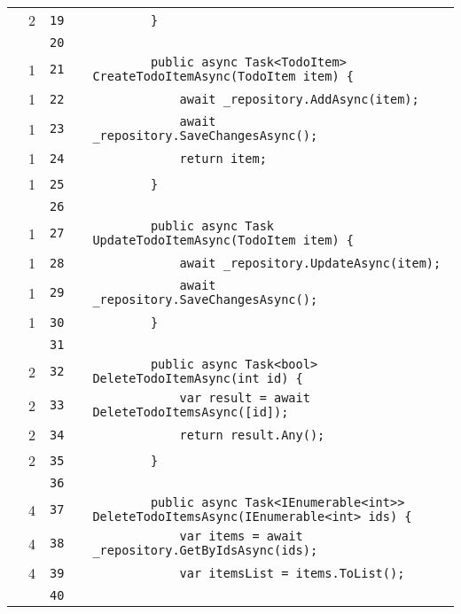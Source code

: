 \documentclass[a4paper,landscape,10pt]{article}
\begin{document}
\begin{longtable}[l]{lrrll}
\cellcolor{green} & 2 & \verb~19~ & & \verb~        }~\\
\cellcolor{gray} &  & \verb~20~ & & \verb~~\\
\cellcolor{green} & 1 & \verb~21~ & & \verb~        public async Task<TodoItem> CreateTodoItemAsync(TodoItem item) {~\\
\cellcolor{green} & 1 & \verb~22~ & & \verb~            await _repository.AddAsync(item);~\\
\cellcolor{green} & 1 & \verb~23~ & & \verb~            await _repository.SaveChangesAsync();~\\
\cellcolor{green} & 1 & \verb~24~ & & \verb~            return item;~\\
\cellcolor{green} & 1 & \verb~25~ & & \verb~        }~\\
\cellcolor{gray} &  & \verb~26~ & & \verb~~\\
\cellcolor{green} & 1 & \verb~27~ & & \verb~        public async Task UpdateTodoItemAsync(TodoItem item) {~\\
\cellcolor{green} & 1 & \verb~28~ & & \verb~            await _repository.UpdateAsync(item);~\\
\cellcolor{green} & 1 & \verb~29~ & & \verb~            await _repository.SaveChangesAsync();~\\
\cellcolor{green} & 1 & \verb~30~ & & \verb~        }~\\
\cellcolor{gray} &  & \verb~31~ & & \verb~~\\
\cellcolor{green} & 2 & \verb~32~ & & \verb~        public async Task<bool> DeleteTodoItemAsync(int id) {~\\
\cellcolor{green} & 2 & \verb~33~ & & \verb~            var result = await DeleteTodoItemsAsync([id]);~\\
\cellcolor{green} & 2 & \verb~34~ & & \verb~            return result.Any();~\\
\cellcolor{green} & 2 & \verb~35~ & & \verb~        }~\\
\cellcolor{gray} &  & \verb~36~ & & \verb~~\\
\cellcolor{green} & 4 & \verb~37~ & & \verb~        public async Task<IEnumerable<int>> DeleteTodoItemsAsync(IEnumerable<int> ids) {~\\
\cellcolor{green} & 4 & \verb~38~ & & \verb~            var items = await _repository.GetByIdsAsync(ids);~\\
\cellcolor{green} & 4 & \verb~39~ & & \verb~            var itemsList = items.ToList();~\\
\cellcolor{gray} &  & \verb~40~ & & \verb~~\\

\end{longtable}
\end{document}
